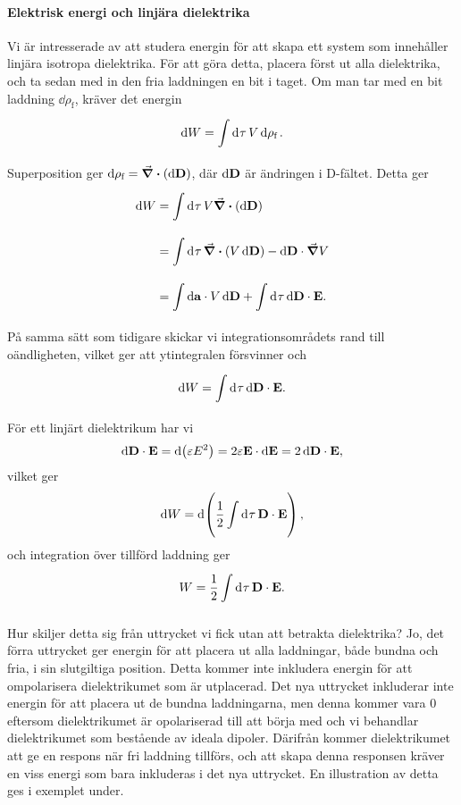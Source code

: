 \paragraph{Elektrisk energi och linjära dielektrika}
Vi är intresserade av att studera energin för att skapa ett system som innehåller linjära isotropa dielektrika. För att göra detta, placera först ut alla dielektrika, och ta sedan med in den fria laddningen en bit i taget. Om man tar med en bit laddning $\dd{\rho_{\text{f}}}$, kräver det energin
\begin{align*}
	\dd{W} = \int\limits_{}^{}\dd[]{\tau}V\dd{\rho_{\text{f}}}.
\end{align*}
Superposition ger $\dd{\rho_{\text{f}}} = \div(\dd{\vb{D}})$, där $\dd{\vb{D}}$ är ändringen i D-fältet. Detta ger
\begin{align*}
	\dd{W} &= \int\limits_{}^{}\dd[]{\tau}V\div(\dd{\vb{D}}) \\
	       &= \int\limits_{}^{}\dd[]{\tau}\div(V\dd{\vb{D}}) - \dd{\vb{D}}\cdot\grad{V} \\
	       &= \int\limits_{}^{}\dd{\vb{a}}\cdot V\dd{\vb{D}} + \int\limits_{}^{}\dd[]{\tau}\dd{\vb{D}}\cdot\vb{E}.
\end{align*}
På samma sätt som tidigare skickar vi integrationsområdets rand till oändligheten, vilket ger att ytintegralen försvinner och
\begin{align*}
	\dd{W} = \int\limits_{}^{}\dd[]{\tau}\dd{\vb{D}}\cdot\vb{E}.
\end{align*}
För ett linjärt dielektrikum har vi
\begin{align*}
	\dd{\vb{D}\cdot\vb{E}} = \dd(\varepsilon E^{2}) = 2\varepsilon\vb{E}\cdot\dd{\vb{E}} = 2\dd{\vb{D}}\cdot\vb{E},
\end{align*}
vilket ger
\begin{align*}
	\dd{W} = \dd(\frac{1}{2}\int\limits_{}^{}\dd[]{\tau}\vb{D}\cdot\vb{E}),
\end{align*}
och integration över tillförd laddning ger
\begin{align*}
	W = \frac{1}{2}\int\limits_{}^{}\dd[]{\tau}\vb{D}\cdot\vb{E}.
\end{align*}

Hur skiljer detta sig från uttrycket vi fick utan att betrakta dielektrika? Jo, det förra uttrycket ger energin för att placera ut alla laddningar, både bundna och fria, i sin slutgiltiga position. Detta kommer inte inkludera energin för att ompolarisera dielektrikumet som är utplacerad. Det nya uttrycket inkluderar inte energin för att placera ut de bundna laddningarna, men denna kommer vara $0$ eftersom dielektrikumet är opolariserad till att börja med och vi behandlar dielektrikumet som bestående av ideala dipoler. Därifrån kommer dielektrikumet att ge en respons när fri laddning tillförs, och att skapa denna responsen kräver en viss energi som bara inkluderas i det nya uttrycket. En illustration av detta ges i exemplet under.

